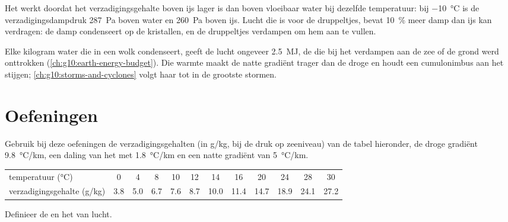 Het  werkt doordat het verzadigingsgehalte boven ijs lager is
dan boven vloeibaar water bij dezelfde temperatuur: bij
\qty{-10}{\degreeCelsius} is de verzadigingsdampdruk \qty{287}{Pa} boven water
en \qty{260}{Pa} boven ijs. Lucht die  is voor de druppeltjes, bevat
\qty{10}{\percent} meer damp dan ijs kan verdragen: de damp condenseert op de
kristallen, en de druppeltjes verdampen om hem aan te vullen.

\begin{remark}\label{rem:g10:why-clouds-form:latent}
Elke kilogram water die in een wolk condenseert, geeft de lucht ongeveer
\qty{2.5}{MJ}, de  die bij het verdampen aan de zee of de grond
werd onttrokken (\cref{ch:g10:earth-energy-budget}). Die warmte maakt de natte
gradiënt trager dan de droge en houdt een cumulonimbus aan het stijgen;
\cref{ch:g10:storms-and-cyclones} volgt haar tot in de grootste stormen.
\end{remark}

\section{Oefeningen}

Gebruik bij deze oefeningen de verzadigingsgehalten (in \unit{g/kg}, bij de druk
op zeeniveau) van de tabel hieronder, de droge gradiënt
\qty{9.8}{\degreeCelsius/km}, een daling van het  met
\qty{1.8}{\degreeCelsius/km} en een natte gradiënt van \qty{5}{\degreeCelsius/km}.

\begin{center}
\small
\begin{tabular}{l*{11}{c}}
\hline
temperatuur (\unit{\degreeCelsius}) & 0 & 4 & 8 & 10 & 12 & 14 & 16 & 20 & 24 & 28 & 30 \\
verzadigingsgehalte (\unit{g/kg}) & 3.8 & 5.0 & 6.7 & 7.6 & 8.7 & 10.0 & 11.4 & 14.7 & 18.9 & 24.1 & 27.2 \\
\hline
\end{tabular}
\end{center}

\begin{exercise}[$\star$]\label{exo:g10:why-clouds-form:1}
Definieer de  en het  van lucht.
\end{exercise}

